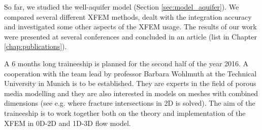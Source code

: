 \documentclass[bibliography=totocnumbered,dvipsnames,FM,Dis]{tulthesis}
\begin{document}
So far, we studied the well-aquifer model (Section \ref{sec:model_aquifer}). We compared several different XFEM methods, 
dealt with the integration accuracy and investigated some other aspects of the XFEM usage. The results
of our work were presented at several conferences and concluded in an article (list in Chapter \ref{chap:publications}).

A 6 months long traineeship is planned for the second half of the year 2016. A cooperation with the team lead
by professor Barbara Wohlmuth at the Technical University in Munich is to be established. They are experts
in the field of porous media modelling and they are also interested in models on meshes with combined dimensions
(see e.g. \cite{schwenck_2015} where fracture intersections in 2D is solved). The aim of the traineeship is to
work together both on the theory and implementation of the XFEM in 0D-2D and 1D-3D flow model.



% 


{\small

% 

}
\end{document}
